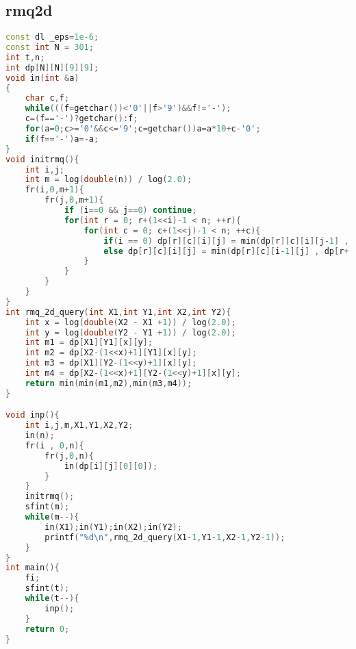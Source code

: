 \subsection{rmq2d}
		\begin{lstlisting}[language=c++]
const dl _eps=1e-6;
const int N = 301;
int t,n;
int dp[N][N][9][9];
void in(int &a)
{
	char c,f;
	while(((f=getchar())<'0'||f>'9')&&f!='-');
	c=(f=='-')?getchar():f;
	for(a=0;c>='0'&&c<='9';c=getchar())a=a*10+c-'0';
	if(f=='-')a=-a;
}
void initrmq(){
	int i,j;
	int m = log(double(n)) / log(2.0);
	fr(i,0,m+1){
		fr(j,0,m+1){
			if (i==0 && j==0) continue;
			for(int r = 0; r+(1<<i)-1 < n; ++r){
				for(int c = 0; c+(1<<j)-1 < n; ++c){
					if(i == 0) dp[r][c][i][j] = min(dp[r][c][i][j-1] , dp[r][c+(1<<(j-1))][i][j-1]); 
					else dp[r][c][i][j] = min(dp[r][c][i-1][j] , dp[r+(1<<(i-1))][c][i-1][j]);
				}
			}
		}
	}
}
int rmq_2d_query(int X1,int Y1,int X2,int Y2){
	int x = log(double(X2 - X1 +1)) / log(2.0); 
	int y = log(double(Y2 - Y1 +1)) / log(2.0); 
	int m1 = dp[X1][Y1][x][y];
	int m2 = dp[X2-(1<<x)+1][Y1][x][y];
	int m3 = dp[X1][Y2-(1<<y)+1][x][y];
	int m4 = dp[X2-(1<<x)+1][Y2-(1<<y)+1][x][y];
	return min(min(m1,m2),min(m3,m4));
}

void inp(){
	int i,j,m,X1,Y1,X2,Y2;
	in(n);
	fr(i , 0,n){
		fr(j,0,n){
			in(dp[i][j][0][0]);
		}
	}
	initrmq();
	sfint(m);
	while(m--){
		in(X1);in(Y1);in(X2);in(Y2);
		printf("%d\n",rmq_2d_query(X1-1,Y1-1,X2-1,Y2-1));
	}
}
int main(){
	fi;
	sfint(t);
	while(t--){
		inp();
	}
	return 0;
}
	\end{lstlisting}